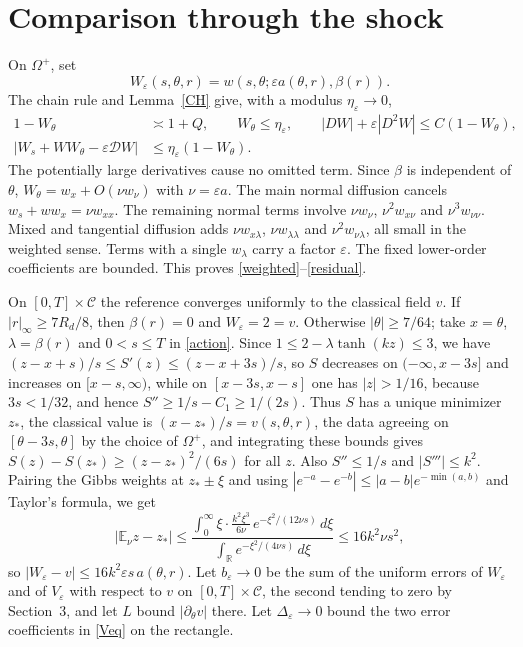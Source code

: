 \documentclass[11pt]{article}
\newcommand{\E}{\mathbb E}
\newcommand{\R}{\mathbb R}
\newcommand{\eps}{\varepsilon}
\newcommand{\cD}{\mathcal D}
\begin{document}
\section{Comparison through the shock}
On $\Omega^+$, set
\[
 W_\eps(s,\theta,r)=w(s,\theta;\eps a(\theta,r),\beta(r)).
\]
The chain rule and Lemma~\ref{CH} give, with a modulus $\eta_\eps\to0$,
\begin{align}
 1-W_\theta&\asymp1+Q,\qquad W_\theta\le\eta_\eps,
 \qquad |DW|+\eps|D^2W|\le C(1-W_\theta),\label{weighted}\\
 |W_s+WW_\theta-\eps\cD W|&\le\eta_\eps(1-W_\theta).\label{residual}
\end{align}
The potentially large derivatives cause no omitted term. Since $\beta$ is independent of $\theta$, $W_\theta=w_x+O(\nu w_\nu)$ with $\nu=\eps a$. The main normal diffusion cancels $w_s+ww_x=\nu w_{xx}$. The remaining normal terms involve $\nu w_\nu$, $\nu^2w_{x\nu}$ and $\nu^3w_{\nu\nu}$. Mixed and tangential diffusion adds $\nu w_{x\lambda}$, $\nu w_{\lambda\lambda}$ and $\nu^2w_{\nu\lambda}$, all small in the weighted sense. Terms with a single $w_\lambda$ carry a factor $\eps$. The fixed lower-order coefficients are bounded. This proves \eqref{weighted}--\eqref{residual}.

On $[0,T]\times\mathcal C$ the reference converges uniformly to the classical field $v$. If $|r|_\infty\ge7R_d/8$, then $\beta(r)=0$ and $W_\eps=2=v$. Otherwise $|\theta|\ge7/64$; take $x=\theta$, $\lambda=\beta(r)$ and $0<s\le T$ in \eqref{action}. Since $1\le2-\lambda\tanh(kz)\le3$, we have $(z-x+s)/s\le S'(z)\le(z-x+3s)/s$, so $S$ decreases on $(-\infty,x-3s]$ and increases on $[x-s,\infty)$, while on $[x-3s,x-s]$ one has $|z|>1/16$, because $3s<1/32$, and hence $S''\ge1/s-C_1\ge1/(2s)$. Thus $S$ has a unique minimizer $z_*$, the classical value is $(x-z_*)/s=v(s,\theta,r)$, the data agreeing on $[\theta-3s,\theta]$ by the choice of $\Omega^+$, and integrating these bounds gives $S(z)-S(z_*)\ge(z-z_*)^2/(6s)$ for all $z$. Also $S''\le1/s$ and $|S'''|\le k^2$. Pairing the Gibbs weights at $z_*\pm\xi$ and using $|e^{-a}-e^{-b}|\le|a-b|e^{-\min(a,b)}$ and Taylor's formula, we get
\[
 |\E_\nu z-z_*|\le\frac{\int_0^\infty\xi\cdot\frac{k^2\xi^3}{6\nu}\,e^{-\xi^2/(12\nu s)}\,d\xi}{\int_{\R}e^{-\xi^2/(4\nu s)}\,d\xi}\le16k^2\nu s^2,
\]
so $|W_\eps-v|\le16k^2\eps s\,a(\theta,r)$. Let $b_\eps\to0$ be the sum of the uniform errors of $W_\eps$ and of $V_\eps$ with respect to $v$ on $[0,T]\times\mathcal C$, the second tending to zero by Section~3, and let $L$ bound $|\partial_\theta v|$ there. Let $\Delta_\eps\to0$ bound the two error coefficients in \eqref{Veq} on the rectangle.
\end{document}
